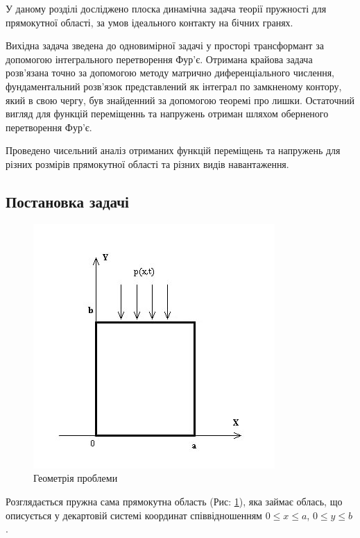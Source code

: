 У даному розділі досліджено плоска динамічна задача теорії пружності для прямокутної області,
за умов ідеального контакту на бічних гранях.

Вихідна задача зведена до одновимірної задачі у просторі трансформант за допомогою інтегрального перетворення Фур'є.
Отримана крайова задача розв'язана точно за допомогою методу матрично диференціального числення,
фундаментальний розв'язок представлений як інтеграл по замкненому контору, який в свою чергу, був знайденний за допомогою теоремі про лишки.
Остаточний вигляд для функцій переміщеннь та напружень отриман шляхом оберненого перетворення Фур'є.

Проведено чисельний аналіз отриманих функцій переміщень та напружень для різних розмірів прямокутної області та різних видів навантаження.

\subsection{Постановка задачі}
\begin{figure}[h]
    \begin{center}
        \includegraphics[scale=1]{images/geometry/image_4.jpg}
    \end{center}
    \caption{Геометрія проблеми}\label{geom_dynamic_1}
\end{figure}
Розглядається пружна сама прямокутна область (Рис: \ref{geom_dynamic_1}), яка займає облась,
що описується у декартовій системі координат співвідношенням $0 \le x \le a$, $0 \le y \le b$.

